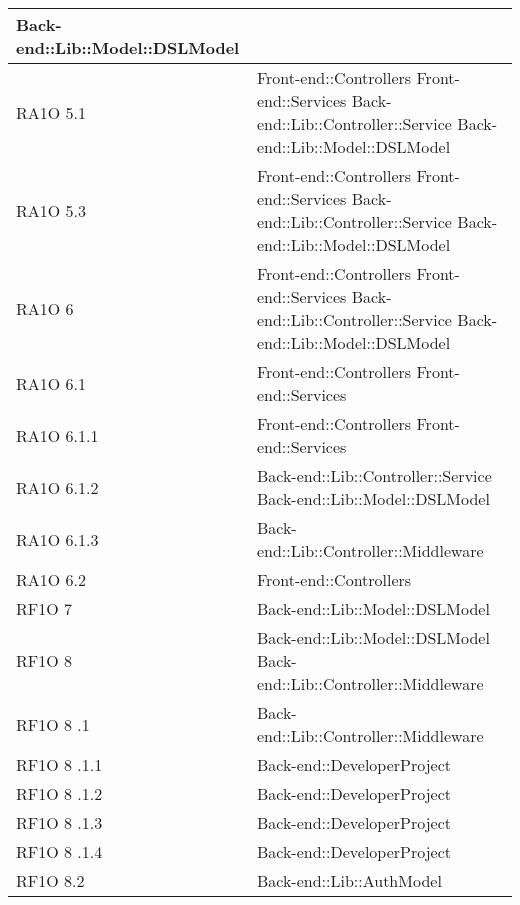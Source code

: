 \begin{center}
\begin{longtable}{|p{3cm}|p{7cm}|}
      			Back-end::Lib::Model::DSLModel \\ \hline
	  RA1O 5.1 & Front-end::Controllers \newline
	  			Front-end::Services \newline
	  			Back-end::Lib::Controller::Service\newline
	  			Back-end::Lib::Model::DSLModel \\ \hline
	  RA1O 5.3 & Front-end::Controllers \newline
	  			Front-end::Services \newline
	  			Back-end::Lib::Controller::Service\newline
	  			Back-end::Lib::Model::DSLModel \\ \hline
	  RA1O 6 & Front-end::Controllers \newline
	  			Front-end::Services \newline
	  			Back-end::Lib::Controller::Service\newline
	  			Back-end::Lib::Model::DSLModel \\ \hline
	  RA1O 6.1 & Front-end::Controllers \newline
	  			Front-end::Services \\ \hline
	  RA1O 6.1.1 & Front-end::Controllers \newline
	  			Front-end::Services \\ \hline
	  RA1O 6.1.2	 & Back-end::Lib::Controller::Service\newline
	  			Back-end::Lib::Model::DSLModel \\ \hline
	  RA1O 6.1.3 & Back-end::Lib::Controller::Middleware \\ \hline
	  RA1O 6.2 & Front-end::Controllers \\ \hline
      RF1O 7 & Back-end::Lib::Model::DSLModel \\ \hline
      RF1O 8	 & Back-end::Lib::Model::DSLModel \newline     
      			Back-end::Lib::Controller::Middleware \\ \hline
      RF1O 8	.1 & Back-end::Lib::Controller::Middleware \\ \hline
      RF1O 8	.1.1 & Back-end::DeveloperProject \\ \hline
      RF1O 8	.1.2 & Back-end::DeveloperProject \\ \hline
      RF1O 8	.1.3 & Back-end::DeveloperProject \\ \hline
      RF1O 8	.1.4 & Back-end::DeveloperProject \\ \hline
      RF1O 8.2 & Back-end::Lib::AuthModel \\ \hline

\end{longtable}
\end{center}
